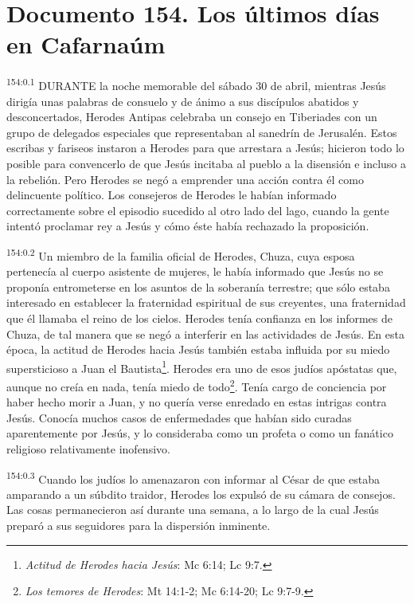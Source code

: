 \chapter{Documento 154. Los últimos días en Cafarnaúm}
\par 
\textsuperscript{154:0.1} DURANTE la noche memorable del sábado 30 de abril, mientras Jesús dirigía unas palabras de consuelo y de ánimo a sus discípulos abatidos y desconcertados, Herodes Antipas celebraba un consejo en Tiberiades con un grupo de delegados especiales que representaban al sanedrín de Jerusalén. Estos escribas y fariseos instaron a Herodes para que arrestara a Jesús; hicieron todo lo posible para convencerlo de que Jesús incitaba al pueblo a la disensión e incluso a la rebelión. Pero Herodes se negó a emprender una acción contra él como delincuente político. Los consejeros de Herodes le habían informado correctamente sobre el episodio sucedido al otro lado del lago, cuando la gente intentó proclamar rey a Jesús y cómo éste había rechazado la proposición.

\par 
\textsuperscript{154:0.2} Un miembro de la familia oficial de Herodes, Chuza, cuya esposa pertenecía al cuerpo asistente de mujeres, le había informado que Jesús no se proponía entrometerse en los asuntos de la soberanía terrestre; que sólo estaba interesado en establecer la fraternidad espiritual de sus creyentes, una fraternidad que él llamaba el reino de los cielos. Herodes tenía confianza en los informes de Chuza, de tal manera que se negó a interferir en las actividades de Jesús. En esta época, la actitud de Herodes hacia Jesús también estaba influida por su miedo supersticioso a Juan el Bautista\footnote{\textit{Actitud de Herodes hacia Jesús}: Mc 6:14; Lc 9:7.}. Herodes era uno de esos judíos apóstatas que, aunque no creía en nada, tenía miedo de todo\footnote{\textit{Los temores de Herodes}: Mt 14:1-2; Mc 6:14-20; Lc 9:7-9.}. Tenía cargo de conciencia por haber hecho morir a Juan, y no quería verse enredado en estas intrigas contra Jesús. Conocía muchos casos de enfermedades que habían sido curadas aparentemente por Jesús, y lo consideraba como un profeta o como un fanático religioso relativamente inofensivo.

\par 
\textsuperscript{154:0.3} Cuando los judíos lo amenazaron con informar al César de que estaba amparando a un súbdito traidor, Herodes los expulsó de su cámara de consejos. Las cosas permanecieron así durante una semana, a lo largo de la cual Jesús preparó a sus seguidores para la dispersión inminente.

